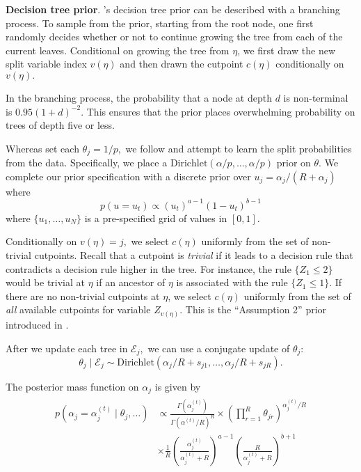 \textbf{Decision tree prior}. \citet{Chipman1998}'s decision tree prior can be described with a branching process.
To sample from the prior, starting from the root node, one first randomly decides whether or not to continue growing the tree from each of the current leaves. 
Conditional on growing the tree from $\eta$, we first draw the new split variable index $v(\eta)$ and then drawn the cutpoint $c(\eta)$ conditionally on $v(\eta).$

In the branching process, the probability that a node at depth $d$ is non-terminal is $0.95(1 + d)^{-2}.$
This ensures that the prior places overwhelming probability on trees of depth five or less.


Whereas \citet{Chipman2010} set each $\theta_{j} = 1/p,$ we follow \citet{Linero2018} and attempt to learn the split probabilities from the data.
Specifically, we place a $\text{Dirichlet}(\alpha/p, \ldots, \alpha/p)$ prior on $\theta.$
We complete our prior specification with a discrete prior over $u_{j} = \alpha_{j}/(R + \alpha_{j})$ where
$$
p(u = u_{t}) \propto (u_{t})^{a-1}(1 - u_{t})^{b-1}
$$
where $\{u_{1}, \ldots, u_{N}\}$ is a pre-specified grid of values in $[0,1].$

Conditionally on $v(\eta) = j,$ we select $c(\eta)$ uniformly from the set of non-trivial cutpoints.
Recall that a cutpoint is \textit{trivial} if it leads to a decision rule that contradicts a decision rule higher in the tree.
For instance, the rule $\{Z_{1} \leq 2 \}$ would be trivial at $\eta$ if an ancestor of $\eta$ is associated with the rule $\{Z_{1} \leq 1\}.$
If there are no non-trivial cutpoints at $\eta$, we select $c(\eta)$ uniformly from the set of \textit{all} available cutpoints for variable $Z_{v(\eta)}.$ 
This is the ``Assumption 2'' prior introduced in \citet{Linero2018}.

After we update each tree in $\mathcal{E}_{j},$ we can use a conjugate update of $\theta_{j}$:
$$
\theta_{j} \mid \mathcal{E}_{j} \sim \text{Dirichlet}(\alpha_{j}/R + s_{j1}, \ldots, \alpha_{j}/R + s_{jR}).
$$

The posterior mass function on $\alpha_{j}$ is given by
\begin{align}
\begin{split}
p(\alpha_{j} = \alpha_{j}^{(t)} \mid \theta_{j}, \ldots) &\propto \frac{\Gamma(\alpha^{(t)}_{j})}{\Gamma(\alpha^{(t)}/R)^{R}} \times \left(\prod_{r = 1}^{R}{\theta_{jr}}\right)^{\alpha_{j}^{(t)}/R} \\
&\times \frac{1}{R}\left(\frac{\alpha_{j}^{(t)}}{\alpha_{j}^{(t)} + R}\right)^{a-1}\left(\frac{R}{\alpha_{j}^{(t)} + R}\right)^{b+1}
\end{split}
\end{align}

